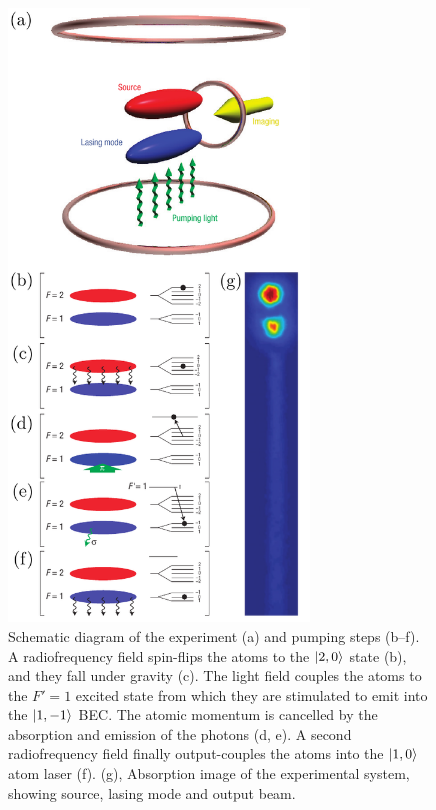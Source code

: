 \begin{figure}
    \centering
    \includegraphics[width=8cm]{ExperimentSchematic}
    \caption{Schematic diagram of the experiment (a) and pumping steps (b--f).  A radiofrequency field spin-flips the atoms to the ${\left|2, 0\right>}$ state (b), and they fall under gravity (c).  The light field couples the atoms to the $F'=1$ excited state from which they are stimulated to emit into the ${\left|1, -1\right>}$ BEC.  The atomic momentum is cancelled by the absorption and emission of the photons (d, e).  A second radiofrequency field finally output-couples the atoms into the ${\left|1, 0\right>}$ atom laser (f).  (g), Absorption image of the experimental system, showing source, lasing mode and output beam.}
    \label{OpticalPumping:ExperimentSchematic}
\end{figure}

